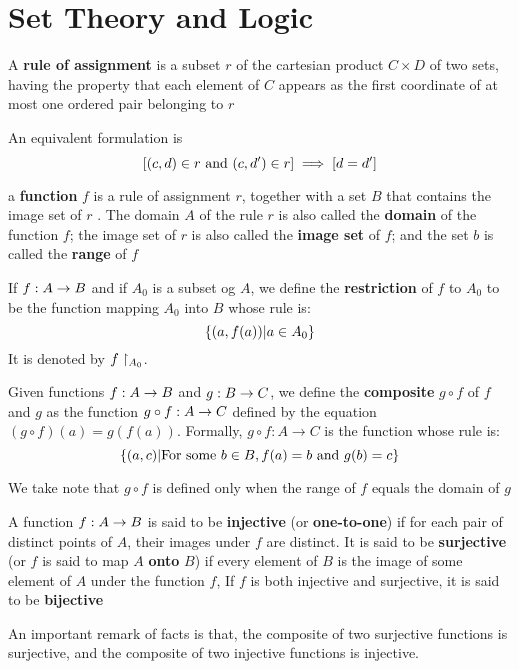 \section{Set Theory and Logic}




\begin{defn}
	A \textbf{rule of assignment} is a subset $r$ of the cartesian product $C \times D$ of two sets, having the property that each element of $C$ appears as the first coordinate of at most one ordered pair belonging to $r$
\end{defn}
An equivalent formulation is
\[ [ (c,d) \in r \textrm{ and } (c,d') \in r ] \implies [d = d'] \]

\begin{defn}
	a \textbf{function } $f$ is a rule of assignment $r$, together with a set $B$ that contains the image set of $r$ . The domain $A$ of the rule $r$ is also called the \textbf{domain} of the function $f$; the image set of $r$ is also called the \textbf{image set} of $f$; and the set $b$ is called the \textbf{range} of $f$
\end{defn}

\begin{defn}
	If $f : A \rightarrow B$ and if $A_0$ is a subset og $A$, we define the \textbf{restriction} of $f$ to $A_0$ to be the function mapping $A_0$ into $ B $ whose rule is:
	\[ \left\lbrace (a,f(a)) | a \in A_0 \right\rbrace \]
	It is denoted by $ f\restriction_{A_0} $.
\end{defn}

\begin{defn}
	Given functions $f : A \rightarrow B$ and $g : B \rightarrow C $, we define the \textbf{composite} $ g \circ f$ of $f$ and $g$ as the function $ g \circ f : A \rightarrow C $ defined by the equation $ (g \circ f)(a) = g(f(a)) $.
	Formally, $  g \circ f: A \rightarrow C $ is the function whose rule is:
	\[ \left\lbrace (a,c) | \textrm{For some } b \in B, f(a)= b \textrm{ and } g(b) = c \right\rbrace \]
\end{defn}
We take note that $ g \circ f$ is defined only when the range of $f$ equals the domain of $g$
\begin{defn}
	A function $ f : A \rightarrow B $ is said to be \textbf{injective} (or \textbf{one-to-one}) if for each pair of distinct points of $A$, their images under $f$ are distinct. It is said to be \textbf{surjective} (or $f$ is said to map $A$ \textbf{onto} $B$) if every element of $B$ is the image of some element of $A$ under the function $f$, If $f$ is both injective and surjective, it is said to be \textbf{bijective} 
\end{defn}
An important remark of facts is that, the composite of two surjective functions is surjective, and the composite of two injective functions is injective.

